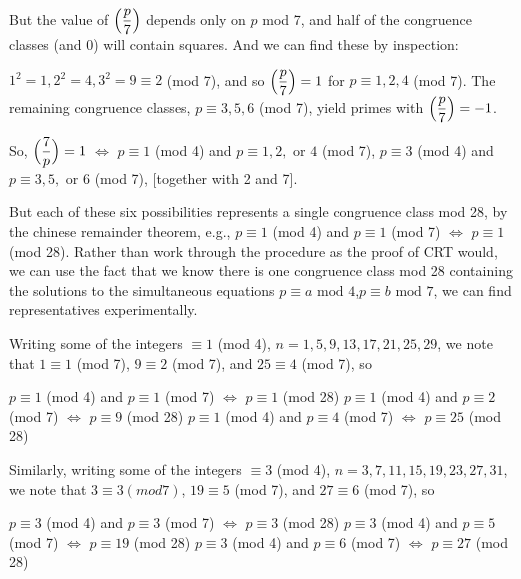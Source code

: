But the value of $\displaystyle \Big({{p}\over{7}}\Big)$ depends only on $p$ mod 7, and 
half of the congruence classes (and 0) will contain squares. And we can find these
by inspection:

\ssk

$1^2=1, 2^2=4, 3^2=9\equiv 2$ (mod 7), and so $\displaystyle \Big({{p}\over{7}}\Big)=1$
for $p\equiv 1,2,4$ (mod 7). The remaining congruence classes, 
$p\equiv 3,5,6$ (mod 7), yield primes with $\displaystyle \Big({{p}\over{7}}\Big)=-1$.

\msk

So, $\displaystyle \Big({{7}\over{p}}\Big) = 1$ $\Leftrightarrow$ 
$p\equiv 1$ (mod 4) and $p\equiv 1,2,\text{ or }4$ (mod 7), 
$p\equiv 3$ (mod 4) and $p\equiv 3,5,\text{ or }6$ (mod 7), [together with 2 and 7].

\ssk

But each of these six possibilities represents a single congruence class
mod 28, by the chinese remainder theorem, e.g., $p\equiv 1$ (mod 4) and $p\equiv 1$ (mod 7)
$\Leftrightarrow$ $p\equiv 1$ (mod 28). Rather than work through the procedure 
as the proof of CRT would, we can use the fact that we know there is one
congruence class mod 28 containing the solutions to the simultaneous equations
$p\equiv a\text{ mod }4$,$p\equiv b\text{ mod }7$, we can find representatives
experimentally.

\ssk

Writing some of the integers $\equiv 1$ (mod 4), $n=1,5,9,13,17,21,25,29$,
we note that $1\equiv 1$ (mod 7), $9\equiv 2$ (mod 7), and $25\equiv 4$ (mod 7),
so 

\ssk

$p\equiv 1$ (mod 4) and $p\equiv 1$ (mod 7) $\Leftrightarrow$ $p\equiv 1$ (mod 28)
$p\equiv 1$ (mod 4) and $p\equiv 2$ (mod 7) $\Leftrightarrow$ $p\equiv 9$ (mod 28)
$p\equiv 1$ (mod 4) and $p\equiv 4$ (mod 7) $\Leftrightarrow$ $p\equiv 25$ (mod 28)

\ssk

Similarly, writing some of the integers $\equiv 3$ (mod 4), $n=3,7,11,15,19,23,27,31$,
we note that $3\equiv 3 (mod 7)$, $19\equiv 5$ (mod 7), and $27\equiv 6$ (mod 7),
so 

\ssk

$p\equiv 3$ (mod 4) and $p\equiv 3$ (mod 7) $\Leftrightarrow$ $p\equiv 3$ (mod 28)
$p\equiv 3$ (mod 4) and $p\equiv 5$ (mod 7) $\Leftrightarrow$ $p\equiv 19$ (mod 28)
$p\equiv 3$ (mod 4) and $p\equiv 6$ (mod 7) $\Leftrightarrow$ $p\equiv 27$ (mod 28)

